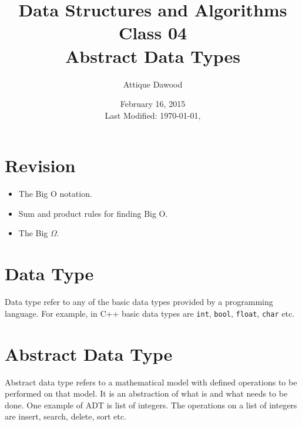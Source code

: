\documentclass[12pt,a4paper]{article}
\title{Data Structures and Algorithms\\Class 04\\Abstract Data Types}
\author{Attique Dawood}
\date{February 16, 2015\\[0.2cm] Last Modified: \today, \currenttime}
\begin{document}
\maketitle
\section{Revision}
\begin{itemize}
\item The Big O notation.
\item Sum and product rules for finding Big O.
\item The Big $\Omega$.
\end{itemize}
\section{Data Type}
Data type refer to any of the basic data types provided by a programming language. For example, in C++ basic data types are \verb|int|, \verb|bool|, \verb|float|, \verb|char| etc.
\section{Abstract Data Type}
Abstract data type refers to a mathematical model with defined operations to be performed on that model. It is an abstraction of what is and what needs to be done. One example of ADT is list of integers. The operations on a list of integers are insert, search, delete, sort etc.
\end{document}
